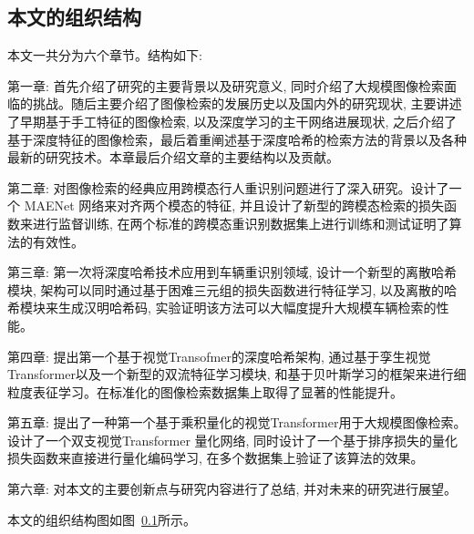 \subsection{本文的组织结构}
本文一共分为六个章节。结构如下: \par
第一章: 首先介绍了研究的主要背景以及研究意义, 同时介绍了大规模图像检索面临的挑战。随后主要介绍了图像检索的发展历史以及国内外的研究现状, 主要讲述了早期基于手工特征的图像检索, 以及深度学习的主干网络进展现状, 之后介绍了基于深度特征的图像检索，最后着重阐述基于深度哈希的检索方法的背景以及各种最新的研究技术。本章最后介绍文章的主要结构以及贡献。 \par
第二章: 对图像检索的经典应用跨模态行人重识别问题进行了深入研究。设计了一个 MAENet 网络来对齐两个模态的特征, 并且设计了新型的跨模态检索的损失函数来进行监督训练, 在两个标准的跨模态重识别数据集上进行训练和测试证明了算法的有效性。 \par
第三章: 第一次将深度哈希技术应用到车辆重识别领域, 设计一个新型的离散哈希模块, 架构可以同时通过基于困难三元组的损失函数进行特征学习, 以及离散的哈希模块来生成汉明哈希码, 实验证明该方法可以大幅度提升大规模车辆检索的性能。 \par
第四章: 提出第一个基于视觉Transofmer的深度哈希架构, 通过基于孪生视觉Transformer以及一个新型的双流特征学习模块, 和基于贝叶斯学习的框架来进行细粒度表征学习。在标准化的图像检索数据集上取得了显著的性能提升。 \par
第五章: 提出了一种第一个基于乘积量化的视觉Transformer用于大规模图像检索。设计了一个双支视觉Transformer 量化网络, 同时设计了一个基于排序损失的量化损失函数来直接进行量化编码学习, 在多个数据集上验证了该算法的效果。 \par
第六章: 对本文的主要创新点与研究内容进行了总结, 并对未来的研究进行展望。 \par 
本文的组织结构图如图~\ref{}所示。